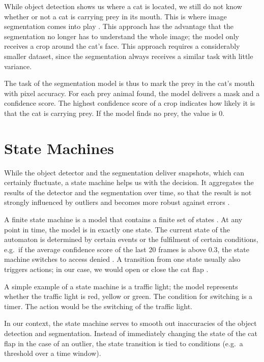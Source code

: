 While object detection shows us where a cat is located, we still do not know whether or not a cat is carrying prey in its mouth. This is where image segmentation comes into play \cite{minaee2022segmentation, he2017maskrcnn}.
This approach has the advantage that the segmentation no longer has to understand the whole image; the model only receives a crop around the cat's face. This approach requires a considerably smaller dataset, since the segmentation always receives a similar task with little variance.

The task of the segmentation model is thus to mark the prey in the cat's mouth with pixel accuracy. For each prey animal found, the model delivers a mask and a confidence score. The highest confidence score of a crop indicates how likely it is that the cat is carrying prey. If the model finds no prey, the value is 0.

\section{State Machines}
\label{subsec:fsm}

While the object detector and the segmentation deliver snapshots, which can certainly fluctuate, a state machine helps us with the decision. It aggregates the results of the detector and the segmentation over time, so that the result is not strongly influenced by outliers and becomes more robust against errors \cite{han2016seqnms, kang2018tcnn}.

A finite state machine is a model that contains a finite set of states \cite{hopcroft2006automata}. At any point in time, the model is in exactly one state. The current state of the automaton is determined by certain events or the fulfilment of certain conditions, e.g.\ if the average confidence score of the last 20 frames is above 0.3, the state machine switches to access denied \cite{harel1987statecharts}. A transition from one state usually also triggers actions; in our case, we would open or close the cat flap \cite{mealy1955method, moore1956gedanken}.

A simple example of a state machine is a traffic light; the model represents whether the traffic light is red, yellow or green. The condition for switching is a timer. The action would be the switching of the traffic light.

In our context, the state machine serves to smooth out inaccuracies of the object detection and segmentation. Instead of immediately changing the state of the cat flap in the case of an outlier, the state transition is tied to conditions (e.g.\ a threshold over a time window).